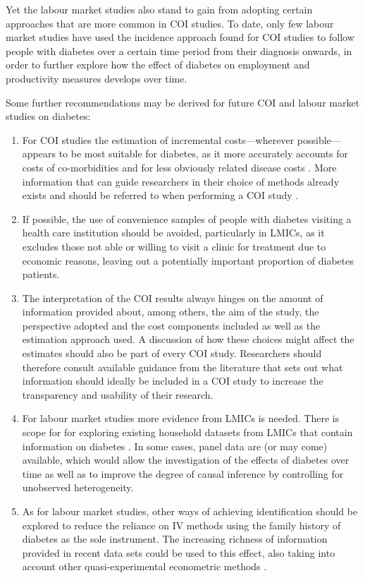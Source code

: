 \documentclass[12pt,english]{article}
\begin{document}
Yet the labour market studies also stand to gain from adopting certain approaches that are more common in \ac{COI} studies. To date, only few labour market studies have used the incidence approach found for \ac{COI} studies to follow people with diabetes over a certain time period from their diagnosis onwards, in order to further explore how the effect of diabetes on employment and productivity measures develops over time.

Some further recommendations may be derived for future \ac{COI} and labour market studies on diabetes: 
\begin{enumerate}


\item	For \ac{COI} studies the estimation of incremental costs---wherever possible---appears to be most suitable for diabetes, as it more accurately accounts for costs of co-morbidities  and for less obviously related disease costs \parencite{Honeycutt2009a,Tunceli2010c}. More information that can guide researchers in their choice of methods already exists and should be referred to when performing a \ac{COI} study \parencite{Akobundu2006}.

\item	If possible, the use of convenience samples of people with diabetes visiting a health care institution should be avoided, particularly in \acp{LMIC}, as it excludes those not able or willing to visit a clinic for treatment due to economic reasons, leaving out a potentially important proportion of diabetes patients.

\item	The interpretation of the \ac{COI} results always hinges on the amount of information provided about, among others, the aim of the study, the perspective adopted and the cost components included as well as the estimation approach used. A discussion of how these choices might affect the estimates should also be part of every \ac{COI} study. Researchers should therefore consult available guidance from the literature that sets out what information should ideally be included in a \ac{COI} study \parencite{Larg2011} to increase the transparency and usability of their research. 

\item	For labour market studies more evidence from \acp{LMIC} is needed. There is scope for for exploring existing household datasets from \acp{LMIC} that contain information on diabetes \parencite{Seuring2014}. In some cases, panel data are (or may come) available, which would allow the investigation of the effects of diabetes over time as well as to improve the degree of causal inference by controlling for unobserved heterogeneity.

\item	As for labour market studies, other ways of achieving identification should be explored to reduce the reliance on \ac{IV} methods using the family history of diabetes as the sole instrument. The increasing richness of information provided in recent data sets could be used to this effect, also taking into account other quasi-experimental econometric methods \parencite{Craig2012}.
\end{enumerate}
\end{document}
